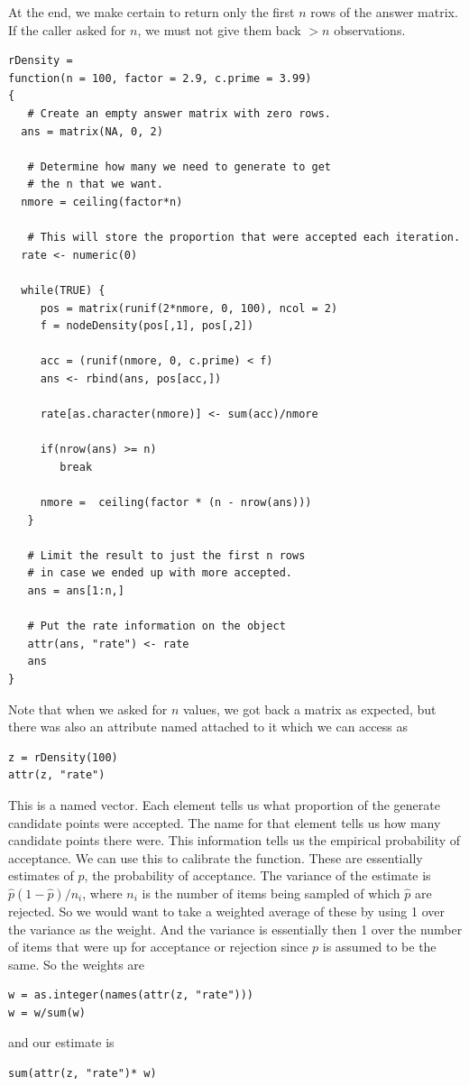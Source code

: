 At the end, we make certain to return only the first $n$ rows of the
answer matrix. If the caller asked for $n$, we must not give them back
$> n$ observations.

{\footnotesize{
\begin{verbatim}
rDensity =
function(n = 100, factor = 2.9, c.prime = 3.99)
{
   # Create an empty answer matrix with zero rows.
  ans = matrix(NA, 0, 2)

   # Determine how many we need to generate to get
   # the n that we want. 
  nmore = ceiling(factor*n)

   # This will store the proportion that were accepted each iteration.
  rate <- numeric(0)
  
  while(TRUE) {
     pos = matrix(runif(2*nmore, 0, 100), ncol = 2)
     f = nodeDensity(pos[,1], pos[,2])
     
     acc = (runif(nmore, 0, c.prime) < f)
     ans <- rbind(ans, pos[acc,])

     rate[as.character(nmore)] <- sum(acc)/nmore
     
     if(nrow(ans) >= n)
        break

     nmore =  ceiling(factor * (n - nrow(ans)))
   }

   # Limit the result to just the first n rows
   # in case we ended up with more accepted.
   ans = ans[1:n,]

   # Put the rate information on the object
   attr(ans, "rate") <- rate
   ans
}
\end{verbatim}
}}


Note that when we asked for $n$ values, we got back 
a matrix as expected, but there was also an attribute
named  attached to it which we can access
as 
\begin{verbatim}
z = rDensity(100)
attr(z, "rate")
\end{verbatim}
This is a named vector.  Each element tells us what proportion of the
generate candidate points were accepted.  The name for that element
tells us how many candidate points there were.  This information tells
us the empirical probability of acceptance.  We can use this to
calibrate the function.  These are essentially estimates of $p$, the
probability of acceptance.  The variance of the estimate is $ \hat{p}
(1 - \hat{p})/n_i$, where $n_i$ is the number of items being sampled
of which $\hat{p}$ are rejected.  So we would want to take a weighted
average of these by using 1 over the variance as the weight.  And the
variance is essentially then 1 over the number of items that were up
for acceptance or rejection since $p$ is assumed to be the same.  So
the weights are 
\begin{verbatim}
w = as.integer(names(attr(z, "rate")))
w = w/sum(w)
\end{verbatim}
and our estimate is 
\begin{verbatim}
sum(attr(z, "rate")* w)
\end{verbatim}

